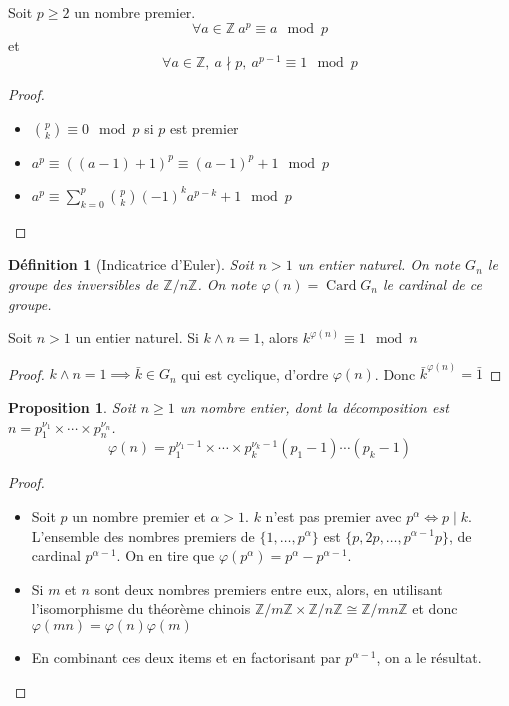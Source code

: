 \documentclass[french]{article}
\newtheorem{definition}{Définition}
\newtheorem{proposition}{Proposition}
\newcommand{\Z}{\mathbb{Z}}
\begin{document}
  \begin{theorem}[Fermat]
    Soit $p\geq 2$ un nombre premier. \[ \forall a\in\Z\ a^p \equiv a
    \mod p \] et \[ \forall a\in\Z,\ a \nmid p,\ a^{p-1} \equiv 1 \mod
    p \]
  \end{theorem}
  \begin{proof}
    \begin{itemize}
      \item $\displaystyle\binom{p}{k} \equiv 0 \mod p$ si $p$ est
        premier
      \item $a^p \equiv ((a-1) + 1)^p \equiv (a-1)^p +1 \mod p$
      \item $a^p \equiv
        \displaystyle\sum_{k=0}^p\binom{p}{k}(-1)^ka^{p-k} + 1 \mod p$
    \end{itemize}
  \end{proof}


  \begin{definition}[Indicatrice d'Euler]
    Soit $n>1$ un entier naturel. On note $G_n$ le groupe des
    inversibles de $\Z/n\Z$. On note $\varphi(n) = \mathop{Card} G_n$ le
    cardinal de ce groupe.
  \end{definition}

  \begin{theorem}[Euler]
    Soit $n > 1$ un entier naturel. Si $k\wedge n = 1$, alors
    $k^{\varphi(n)} \equiv 1 \mod n$
  \end{theorem}
  \begin{proof}
    $k\wedge n = 1 \implies \bar{k}\in G_n$ qui est cyclique, d'ordre
    $\varphi(n)$. Donc $\bar{k}^{\varphi(n)} = \bar{1}$
  \end{proof}

  \begin{proposition}
    Soit $n \geq 1$ un nombre entier, dont la décomposition est $n =
    p_1^{\nu_1}\times\cdots\times p_n^{\nu_n}$.
    \[ \varphi(n) = p_1^{\nu_1-1}\times\cdots\times p_k^{\nu_k-1}(p_1
    -1) \cdots (p_k - 1) \]
  \end{proposition}
  \begin{proof}
    \begin{itemize}
      \item Soit $p$ un nombre premier et $\alpha >1$. $k$ n'est pas
        premier avec $p^{\alpha} \iff p \mid k$. L'ensemble des nombres
        premiers de $\lbrace 1,\dots,p^{\alpha}\rbrace$ est $\lbrace
        p,2p,\dots,p^{\alpha -1}p\rbrace$, de cardinal $p^{\alpha -1}$.
        On en tire que $\varphi(p^{\alpha}) = p^{\alpha} - p^{\alpha
        -1}$.
      \item Si $m$ et $n$ sont deux nombres premiers entre eux, alors,
        en utilisant l'isomorphisme du théorème chinois $\Z/m\Z\times
        \Z/n\Z \cong \Z/mn\Z$ et donc $\varphi(mn) = \varphi(n)
        \varphi(m)$
      \item En combinant ces deux items et en factorisant par
        $p^{\alpha -1}$, on a le résultat.
    \end{itemize}
  \end{proof}
\end{document}
